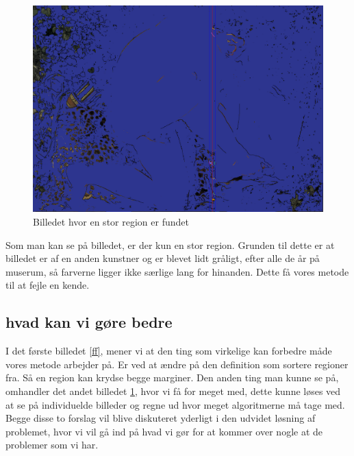 \begin{figure}[h!!]
	\begin{center}
		\includegraphics[scale=0.20,angle=0]{afsnit/afprovning/billeder/nicofloodfillbilledet.png}
	\end{center}
	\caption[]{Billedet hvor en stor region er fundet}
	\label{nicofill}
\end{figure}

Som man kan se på billedet, er der kun en stor region. Grunden til dette
er at billedet er af en anden kunstner og er blevet lidt gråligt, efter
alle de år på muserum, så farverne ligger ikke særlige lang for
hinanden. Dette få vores metode til at fejle en kende.

\subsection{hvad kan vi gøre bedre}
I det første billedet \ref{ff}, mener vi at den ting som virkelige kan
forbedre måde vores metode arbejder på. Er ved at ændre på den
definition som sortere regioner fra. Så en region kan krydse begge
marginer. Den anden ting man kunne se på, omhandler det andet billedet
\ref{nicofill}, hvor vi få for meget med, dette kunne løses ved at se på
individuelde billeder og regne ud hvor meget algoritmerne må tage med.
Begge disse to forslag vil blive diskuteret yderligt i den udvidet
løsning af problemet, hvor vi vil gå ind på hvad vi gør for at kommer
over nogle at de problemer som vi har.

